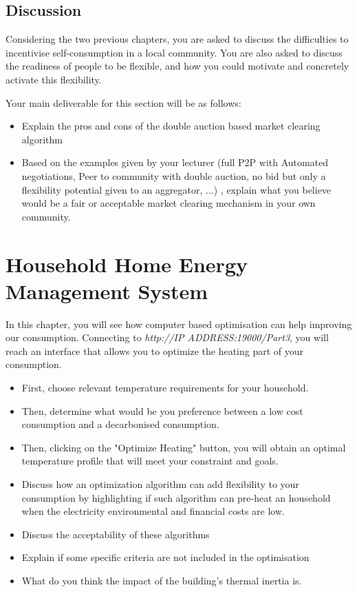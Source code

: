 \documentclass[a4paper, chapterprefix=true, openany]{scrbook}
\begin{document}
	
	
	
	\section{Discussion} 
	Considering the two previous chapters, you are asked to discuss the difficulties to incentivise self-consumption in a local community. You are also asked to discuss the readiness of people to be flexible, and how you could motivate and concretely activate this flexibility.
	
	Your main deliverable for this section will be as follows:
	\begin{itemize}
		\item Explain the pros and cons of the double auction based market clearing algorithm
		\item Based on the examples given by your lecturer (full P2P with Automated negotiations, Peer to community with double auction, no bid but only a flexibility potential given to an aggregator, ...) , explain what you believe would be  a fair or acceptable market clearing mechanism in your own community.
	\end{itemize}


\chapter{Household Home Energy Management System}
In this chapter, you will see how computer based optimisation can help improving our consumption.
Connecting to \textit{http://IP ADDRESS:19000/Part3}, you will reach an interface that allows you to optimize the heating part of your consumption.

\begin{itemize}
	\item First, choose relevant temperature requirements for your household.
	\item Then, determine what would be you preference between a low cost consumption and a decarbonised consumption.
	\item Then, clicking on the "Optimize Heating" button, you will obtain an optimal temperature profile that will meet your constraint and goals.
	\item Discuss how an optimization algorithm can add flexibility to your consumption by highlighting if such algorithm can pre-heat an household when the electricity environmental and financial costs are low.
	\item Discuss the acceptability of these algorithms
	\item Explain if some specific criteria are not included in the optimisation
	\item What do you think the impact of the building's thermal inertia is.
\end{itemize}
\end{document}
